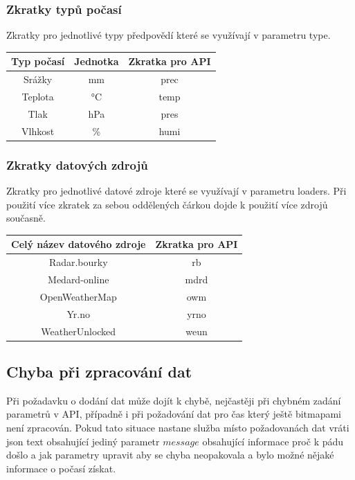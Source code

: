 \documentclass[czech,bachelor,dept460,male,csharp,cpdeclaration]{diploma}
\begin{document}
	\subsubsection{Zkratky typů počasí}
	
	Zkratky pro jednotlivé typy předpovědí které se využívají v parametru type.
	
	\begin{center}
		\begin{tabular}{c c c}
			Typ počasí & Jednotka & Zkratka pro API\\
			\midrule
			Srážky & mm & prec \\
			Teplota & °C & temp \\
			Tlak & hPa & pres \\
			Vlhkost & \% & humi \\
		\end{tabular}
	\end{center}
	
	\subsubsection{Zkratky datových zdrojů}
	
	Zkratky pro jednotlivé datové zdroje které se využívají v parametru loaders. Při použití více zkratek za sebou oddělených čárkou dojde k použití více zdrojů současně.
	
	\begin{center}
		\begin{tabular}{c c}
			Celý název datového zdroje & Zkratka pro API\\
			\midrule
			Radar.bourky & rb \\
			Medard-online & mdrd \\
			OpenWeatherMap & owm \\
			Yr.no & yrno \\
			WeatherUnlocked & weun \\
		\end{tabular}
	\end{center}
	
	\subsection{Chyba při zpracování dat}
	
	Při požadavku o dodání dat může dojít k chybě, nejčastěji při chybném zadání parametrů v API, případně i při požadování dat pro čas který ještě bitmapami není zpracován. Pokud tato situace nastane služba místo požadovanách dat vráti json text obsahující jediný parametr $message$ obsahující informace proč k pádu došlo a jak parametry upravit aby se chyba neopakovala a bylo možné nějaké informace o počasí získat.
	
\end{document}
